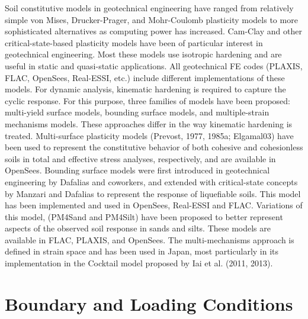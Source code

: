 Soil constitutive models in geotechnical engineering have ranged from relatively simple von Mises, Drucker-Prager, and Mohr-Coulomb plasticity models to more sophisticated alternatives as computing power has increased. Cam-Clay and other critical-state-based plasticity models have been of particular interest in geotechnical engineering. Most these models use isotropic hardening and are useful in static and quasi-static applications. All geotechnical FE codes (PLAXIS, FLAC, OpenSees, Real-ESSI, etc.) include different implementations of these models. For dynamic analysis, kinematic hardening is required to capture the cyclic response. For this purpose, three families of models have been proposed: multi-yield surface models, bounding surface models, and multiple-strain mechanisms models. These approaches differ in the way kinematic hardening is treated. Multi-surface plasticity models (Prevost, 1977, 1985a; Elgamal03) have been used to represent the constitutive behavior of both cohesive and cohesionless soils in total and eﬀective stress analyses, respectively, and are available in OpenSees. Bounding surface models were first introduced in geotechnical engineering by Dafalias and coworkers, and extended with critical-state concepts by Manzari and Dafalias to represent the response of liquefiable soils. This model has been implemented and used in OpenSees, Real-ESSI and FLAC. Variations of this model, (PM4Sand and PM4Silt) have been proposed to better represent aspects of the observed soil response in sands and silts. These models are available in FLAC, PLAXIS, and OpenSees. The multi-mechanisms approach is defined in strain space and has been used in Japan, most particularly in its implementation in the Cocktail model proposed by Iai et al. (2011, 2013).

\section{Boundary and Loading Conditions}
\label{sec:resp_geotech_5}

